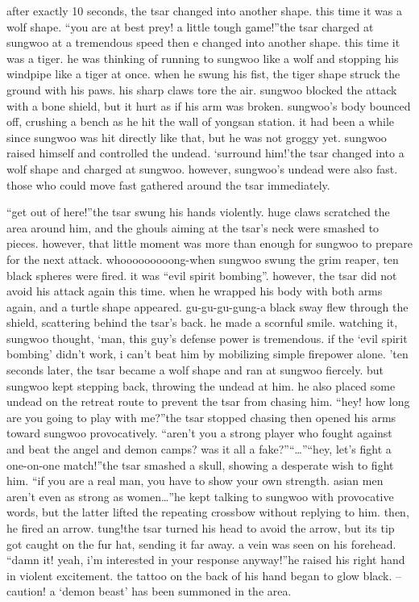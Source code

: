 after exactly 10 seconds, the tsar changed into another shape.
 this time it was a wolf shape.
“you are at best prey! a little tough game!”the tsar charged at sungwoo at a tremendous speed then e changed into another shape.
this time it was a tiger.
 he was thinking of running to sungwoo like a wolf and stopping his windpipe like a tiger at once.
 when he swung his fist, the tiger shape struck the ground with his paws.
 his sharp claws tore the air.
sungwoo blocked the attack with a bone shield, but it hurt as if his arm was broken.
 sungwoo’s body bounced off, crushing a bench as he hit the wall of yongsan station.
it had been a while since sungwoo was hit directly like that, but he was not groggy yet.
sungwoo raised himself and controlled the undead.
‘surround him!’the tsar changed into a wolf shape and charged at sungwoo.
 however, sungwoo’s undead were also fast.
 those who could move fast gathered around the tsar immediately.


“get out of here!”the tsar swung his hands violently.
 huge claws scratched the area around him, and the ghouls aiming at the tsar’s neck were smashed to pieces.
 however, that little moment was more than enough for sungwoo to prepare for the next attack.
whooooooooong-when sungwoo swung the grim reaper, ten black spheres were fired.
 it was “evil spirit bombing”.
however, the tsar did not avoid his attack again this time.
 when he wrapped his body with both arms again, and a turtle shape appeared.
gu-gu-gu-gung-a black sway flew through the shield, scattering behind the tsar’s back.
 he made a scornful smile.
watching it, sungwoo thought, ‘man, this guy’s defense power is tremendous.
 if the ‘evil spirit bombing’ didn’t work, i can’t beat him by mobilizing simple firepower alone.
’ten seconds later, the tsar became a wolf shape and ran at sungwoo fiercely.
 but sungwoo kept stepping back, throwing the undead at him.
 he also placed some undead on the retreat route to prevent the tsar from chasing him.
“hey! how long are you going to play with me?”the tsar stopped chasing then opened his arms toward sungwoo provocatively.
“aren’t you a strong player who fought against and beat the angel and demon camps? was it all a fake?”“…”“hey, let’s fight a one-on-one match!”the tsar smashed a skull, showing a desperate wish to fight him.
“if you are a real man, you have to show your own strength.
 asian men aren’t even as strong as women…”he kept talking to sungwoo with provocative words, but the latter lifted the repeating crossbow without replying to him.
 then, he fired an arrow.
tung!the tsar turned his head to avoid the arrow, but its tip got caught on the fur hat, sending it far away.
 a vein was seen on his forehead.
“damn it! yeah, i’m interested in your response anyway!”he raised his right hand in violent excitement.
 the tattoo on the back of his hand began to glow black.
– caution! a ‘demon beast’ has been summoned in the area.


 